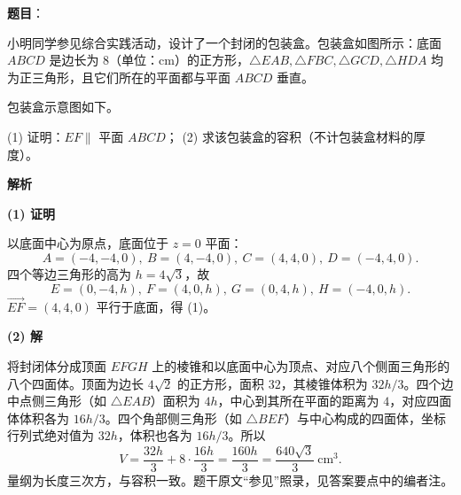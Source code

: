 \begin{answer}

\textbf{题目}：

小明同学参见综合实践活动，设计了一个封闭的包装盒。包装盒如图所示：底面 $ABCD$ 是边长为 $8$（单位：cm）的正方形，$\triangle EAB,\triangle FBC,\triangle GCD,\triangle HDA$ 均为正三角形，且它们所在的平面都与平面 $ABCD$ 垂直。

包装盒示意图如下。
\nopagebreak[4]
\begin{center}\end{center}
\nopagebreak[4]
(1) 证明：$EF\parallel$ 平面 $ABCD$；  
(2) 求该包装盒的容积（不计包装盒材料的厚度）。

\textbf{解析}

\textbf{(1) 证明}

以底面中心为原点，底面位于 $z=0$ 平面：
\nopagebreak[4]
\[A=(-4,-4,0),\ B=(4,-4,0),\ C=(4,4,0),\ D=(-4,4,0).\]
四个等边三角形的高为 $h=4\sqrt3$，故
\nopagebreak[4]
\[E=(0,-4,h),\ F=(4,0,h),\ G=(0,4,h),\ H=(-4,0,h).\]
$\overrightarrow{EF}=(4,4,0)$ 平行于底面，得 (1)。

\textbf{(2) 解}

将封闭体分成顶面 $EFGH$ 上的棱锥和以底面中心为顶点、对应八个侧面三角形的八个四面体。顶面为边长 $4\sqrt2$ 的正方形，面积 $32$，其棱锥体积为 $32h/3$。四个边中点侧三角形（如 $\triangle EAB$）面积为 $4h$，中心到其所在平面的距离为 $4$，对应四面体体积各为 $16h/3$。四个角部侧三角形（如 $\triangle BEF$）与中心构成的四面体，坐标行列式绝对值为 $32h$，体积也各为 $16h/3$。所以
\nopagebreak[4]
\[V=\frac{32h}{3}+8\cdot\frac{16h}{3}
=\frac{160h}{3}=\frac{640\sqrt3}{3}\ \mathrm{cm}^3.\]
量纲为长度三次方，与容积一致。题干原文“参见”照录，见答案要点中的编者注。



\end{answer}
